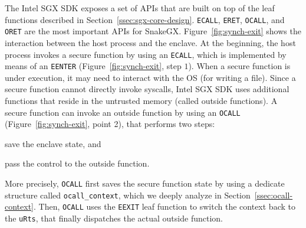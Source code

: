 The Intel SGX SDK exposes a set of APIs that are built on top of the leaf 
functions described in Section~\ref{ssec:sgx-core-design}.
\texttt{ECALL}, \texttt{ERET}, \texttt{OCALL}, and \texttt{ORET} are the most 
important APIs for SnakeGX.
Figure~\ref{fig:synch-exit} shows the interaction between the host process and 
the enclave.
At the beginning, the host process invokes a secure function by using an 
\texttt{ECALL}, which is implemented by means of an \texttt{EENTER} 
(Figure~\ref{fig:synch-exit}, step $1$).
When a secure function is under execution, it may need to interact with the OS 
(\eg for writing a file).
Since a secure function cannot directly invoke syscalls, Intel SGX SDK uses 
additional functions that reside in the untrusted memory (\ie called
outside functions).
A secure function can invoke an outside function by using an \texttt{OCALL} 
(Figure~\ref{fig:synch-exit}, point 2), that performs two steps:
\begin{enumerate*}[label=(\roman*)]
	\item save the enclave state, and
	\item pass the control to the outside function.
\end{enumerate*}
More precisely, \texttt{OCALL} first saves the secure function state by using 
a dedicate structure called \texttt{ocall\_context}, which we deeply analyze 
in Section~\ref{ssec:ocall-context}.
Then, \texttt{OCALL} uses the \texttt{EEXIT} leaf function to switch 
the context back to the \texttt{uRts}, that finally dispatches the
actual outside function.
